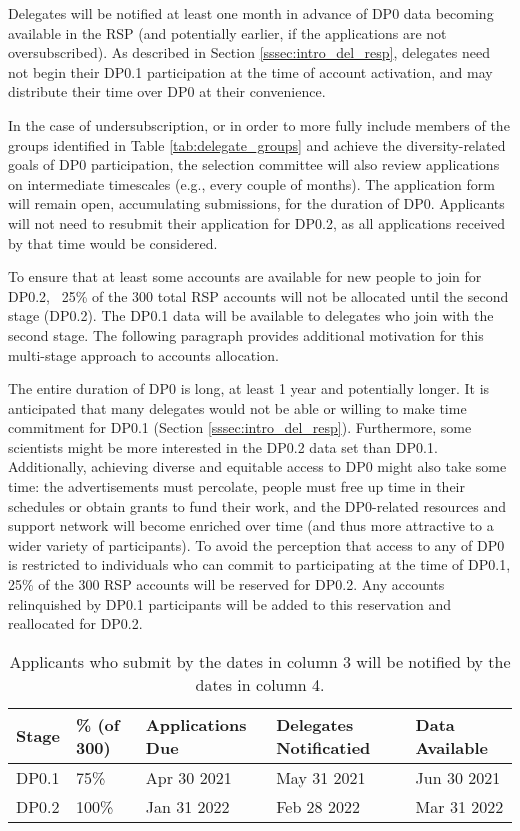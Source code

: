 \documentclass[DM,lsstdraft,authoryear,toc]{lsstdoc}
\begin{document}
Delegates will be notified at least one month in advance of DP0 data becoming available in the RSP (and potentially earlier, if the applications are not oversubscribed).
As described in Section \ref{sssec:intro_del_resp}, delegates need not begin their DP0.1 participation at the time of account activation, and may distribute their time over DP0 at their convenience.

In the case of undersubscription, or in order to more fully include members of the groups identified in Table \ref{tab:delegate_groups} and achieve the diversity-related goals of DP0 participation, the selection committee will also review applications on intermediate timescales (e.g., every couple of months).
The application form will remain open, accumulating submissions, for the duration of DP0.
Applicants will not need to resubmit their application for DP0.2, as all applications received by that time would be considered.

To ensure that at least some accounts are available for new people to join for DP0.2, ~25\% of the 300 total RSP accounts will not be allocated until the second stage (DP0.2).
The DP0.1 data will be available to delegates who join with the second stage.
The following paragraph provides additional motivation for this multi-stage approach to accounts allocation.

The entire duration of DP0 is long, at least 1 year and potentially longer.
It is anticipated that many delegates would not be able or willing to make time commitment for DP0.1 (Section \ref{sssec:intro_del_resp}).
Furthermore, some scientists might be more interested in the DP0.2 data set than DP0.1.
Additionally, achieving diverse and equitable access to DP0 might also take some time: the advertisements must percolate, people must free up time in their schedules or obtain grants to fund their work, and the DP0-related resources and support network will become enriched over time (and thus more attractive to a wider variety of participants).
To avoid the perception that access to any of DP0 is restricted to individuals who can commit to participating at the time of DP0.1, 25\% of the 300 RSP accounts will be reserved for DP0.2.
Any accounts relinquished by DP0.1 participants will be added to this reservation and reallocated for DP0.2.

\begin{table}[!h]
\centering
\caption{Applicants who submit by the dates in column 3 will be notified by the dates in column 4.}\label{tab:selection_timeline}
\begin{tabular}{lllll}
\hline
Stage & \% (of 300) & Applications Due & Delegates Notificatied & Data Available \\
\hline \hline
DP0.1 & 75\%    &  Apr 30 2021   &  May 31 2021  &  Jun 30 2021 \\
DP0.2 & 100\%  &  Jan 31 2022   &  Feb 28 2022  &  Mar 31 2022 \\
\hline
\end{tabular}
\end{table}
\end{document}
